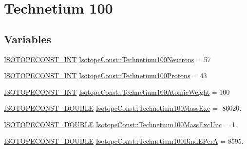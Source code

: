 \hypertarget{group___isotope_const-_technetium-_tc100}{}\section{Technetium 100}
\label{group___isotope_const-_technetium-_tc100}
\subsection*{Variables}
\begin{DoxyCompactItemize}
\item 
\mbox{\hyperlink{group___isotope_const-_macros_ga5f18360b3e99483a35c32d789e62621c}{I\+S\+O\+T\+O\+P\+E\+C\+O\+N\+S\+T\+\_\+\+I\+NT}} \mbox{\hyperlink{group___isotope_const-_technetium-_tc100_gabe08029ddd5a73db168704fa4f5535e4}{Isotope\+Const\+::\+Technetium100\+Neutrons}} = 57
\item 
\mbox{\hyperlink{group___isotope_const-_macros_ga5f18360b3e99483a35c32d789e62621c}{I\+S\+O\+T\+O\+P\+E\+C\+O\+N\+S\+T\+\_\+\+I\+NT}} \mbox{\hyperlink{group___isotope_const-_technetium-_tc100_ga9ab511ac4985f47b9abae97c0114831f}{Isotope\+Const\+::\+Technetium100\+Protons}} = 43
\item 
\mbox{\hyperlink{group___isotope_const-_macros_ga5f18360b3e99483a35c32d789e62621c}{I\+S\+O\+T\+O\+P\+E\+C\+O\+N\+S\+T\+\_\+\+I\+NT}} \mbox{\hyperlink{group___isotope_const-_technetium-_tc100_gaec4fff059aa0d8e8ec46a0a901a1b5e2}{Isotope\+Const\+::\+Technetium100\+Atomic\+Weight}} = 100
\item 
\mbox{\hyperlink{group___isotope_const-_macros_ga8f45a7272ce02c0b4c65c44636ed719a}{I\+S\+O\+T\+O\+P\+E\+C\+O\+N\+S\+T\+\_\+\+D\+O\+U\+B\+LE}} \mbox{\hyperlink{group___isotope_const-_technetium-_tc100_ga9f01347046266da6ebb430eb3ce60e81}{Isotope\+Const\+::\+Technetium100\+Mass\+Exc}} = -\/86020.
\item 
\mbox{\hyperlink{group___isotope_const-_macros_ga8f45a7272ce02c0b4c65c44636ed719a}{I\+S\+O\+T\+O\+P\+E\+C\+O\+N\+S\+T\+\_\+\+D\+O\+U\+B\+LE}} \mbox{\hyperlink{group___isotope_const-_technetium-_tc100_ga118465c790bdd4d01e857c05360dca16}{Isotope\+Const\+::\+Technetium100\+Mass\+Exc\+Unc}} = 1.
\item 
\mbox{\hyperlink{group___isotope_const-_macros_ga8f45a7272ce02c0b4c65c44636ed719a}{I\+S\+O\+T\+O\+P\+E\+C\+O\+N\+S\+T\+\_\+\+D\+O\+U\+B\+LE}} \mbox{\hyperlink{group___isotope_const-_technetium-_tc100_gae555f4a19d116dfe546f5c63f6873ea8}{Isotope\+Const\+::\+Technetium100\+Bind\+E\+PerA}} = 8595.

\end{DoxyCompactItemize}
